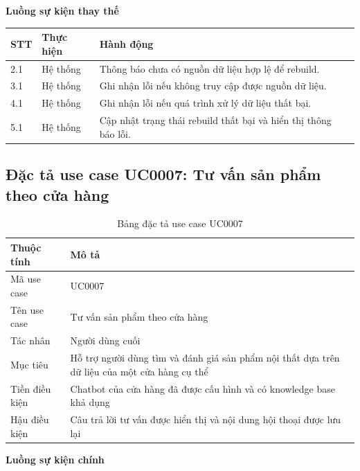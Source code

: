 \documentclass[../DoAn.tex]{subfiles}
\begin{document}
\textbf{Luồng sự kiện thay thế}

\begin{table}[H]
\centering
\begin{tabular}{|p{}|p{}|p{}|}
\hline
\textbf{STT} & \textbf{Thực hiện} & \textbf{Hành động} \\
\hline
2.1 & Hệ thống & Thông báo chưa có nguồn dữ liệu hợp lệ để rebuild. \\
\hline
3.1 & Hệ thống & Ghi nhận lỗi nếu không truy cập được nguồn dữ liệu. \\
\hline
4.1 & Hệ thống & Ghi nhận lỗi nếu quá trình xử lý dữ liệu thất bại. \\
\hline
5.1 & Hệ thống & Cập nhật trạng thái rebuild thất bại và hiển thị thông báo lỗi. \\
\hline
\end{tabular}
\end{table}

\subsection{Đặc tả use case UC0007: Tư vấn sản phẩm theo cửa hàng}
\label{subsection:2.3.4}

\begin{table}[H]
\centering
\caption{Bảng đặc tả use case UC0007}
\label{table:uc0007}
\begin{tabular}{|p{}|p{}|}
\hline
\textbf{Thuộc tính} & \textbf{Mô tả} \\
\hline
Mã use case & UC0007 \\
\hline
Tên use case & Tư vấn sản phẩm theo cửa hàng \\
\hline
Tác nhân & Người dùng cuối \\
\hline
Mục tiêu & Hỗ trợ người dùng tìm và đánh giá sản phẩm nội thất dựa trên dữ liệu của một cửa hàng cụ thể \\
\hline
Tiền điều kiện & Chatbot của cửa hàng đã được cấu hình và có knowledge base khả dụng \\
\hline
Hậu điều kiện & Câu trả lời tư vấn được hiển thị và nội dung hội thoại được lưu lại \\
\hline
\end{tabular}
\end{table}

\textbf{Luồng sự kiện chính}
\end{document}
